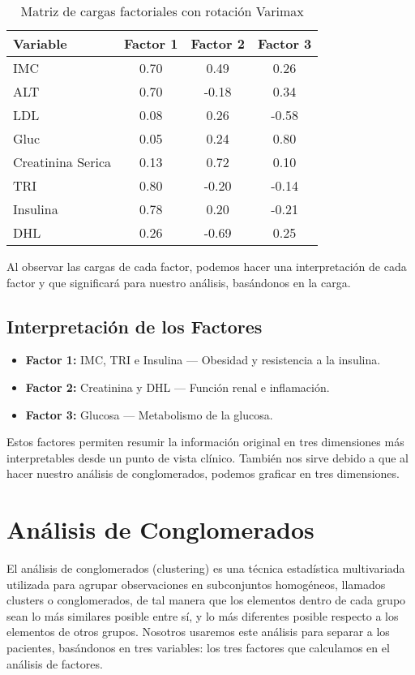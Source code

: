 \documentclass[12pt]{report}
\begin{document}
\begin{table}[H]
\centering
\begin{tabular}{|l|c|c|c|}
\hline
\textbf{Variable} & \textbf{Factor 1} & \textbf{Factor 2} & \textbf{Factor 3} \\
\hline
IMC & 0.70 & 0.49 & 0.26 \\
ALT & 0.70 & -0.18 & 0.34 \\
LDL & 0.08 & 0.26 & -0.58 \\
Gluc & 0.05 & 0.24 & 0.80 \\
Creatinina Serica & 0.13 & 0.72 & 0.10 \\
TRI & 0.80 & -0.20 & -0.14 \\
Insulina & 0.78 & 0.20 & -0.21 \\
DHL & 0.26 & -0.69 & 0.25 \\
\hline
\end{tabular}
\caption{Matriz de cargas factoriales con rotación Varimax}
\end{table}

Al observar las cargas de cada factor, podemos hacer una interpretación de cada factor y que significará para nuestro análisis, basándonos en la carga.

\subsection{Interpretación de los Factores}
\begin{itemize}
    \item \textbf{Factor 1:} IMC, TRI e Insulina — Obesidad y resistencia a la insulina.
    \item \textbf{Factor 2:} Creatinina y DHL — Función renal e inflamación.
    \item \textbf{Factor 3:} Glucosa — Metabolismo de la glucosa.
\end{itemize}

\noindent Estos factores permiten resumir la información original en tres dimensiones más interpretables desde un punto de vista clínico. También nos sirve debido a que al hacer nuestro análisis de conglomerados, podemos graficar en tres dimensiones.

\newpage

\section{Análisis de Conglomerados}
El análisis de conglomerados (clustering) es una técnica estadística multivariada utilizada para agrupar observaciones en subconjuntos homogéneos, llamados clusters o conglomerados, de tal manera que los elementos dentro de cada grupo sean lo más similares posible entre sí, y lo más diferentes posible respecto a los elementos de otros grupos. Nosotros usaremos este análisis para separar a los pacientes, basándonos en tres variables: los tres factores que calculamos en el análisis de factores.
\end{document}
